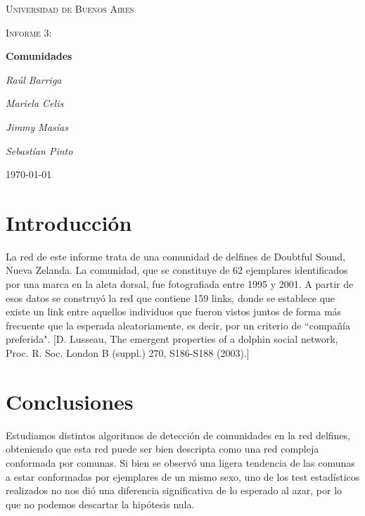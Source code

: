 \documentclass[11pt, spanish]{article}
\begin{document}
\begin{titlepage}
    \centering
    {\scshape\LARGE Universidad de Buenos Aires \par}
    \vspace{1cm}
    {\scshape\Large Informe 3:\par}

    \vspace{1.5cm}
    {\scshape\Large\par}
    {\huge\bfseries  Comunidades\par}
    \vspace{2cm}
    {\Large\itshape Ra\'ul Barriga\par}
    {\Large\itshape Mariela Celis\par}
    {\Large\itshape Jimmy Mas\'ias\par}
    {\Large\itshape Sebast\'ian Pinto\par}

    \vfill

    \vfill

    {\large \today\par}
\end{titlepage}

    \tableofcontents

    \section{Introducción}
    \par La red de este informe trata de una comunidad de delfines de Doubtful Sound, Nueva Zelanda. La comunidad, que se constituye de 62 ejemplares identificados por una marca en la aleta dorsal, fue fotografiada entre 1995 y 2001. A partir de esos datos se construyó la red que contiene 159 links, donde se establece que existe un link entre aquellos individuos que fueron vistos juntos de forma más frecuente que la esperada aleatoriamente, es decir, por un criterio de ``compañía preferida". [D. Lusseau, The emergent properties of a dolphin social network, Proc. R. Soc. London B (suppl.) 270, S186-S188 (2003).]

    
    
    
    

    \newpage
    \section{Conclusiones}
    \par Estudiamos distintos algoritmos de detección de comunidades en la red delfines, obteniendo que esta red puede ser bien descripta como una red compleja conformada por comunas. Si bien se observó una ligera tendencia de las comunas a estar conformadas por ejemplares de un mismo sexo, uno de los test estadísticos realizados no nos dió una diferencia significativa de lo esperado al azar, por lo que no podemos descartar la hipótesis nula.
%
%
\end{document}
